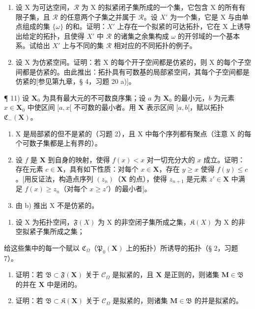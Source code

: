 \begin{enumerate}
\def\labelenumi{\arabic{enumi})}
\setcounter{enumi}{8}
\item
  设 X 为可达空间，\(\mathcal{R}\) 为 X 的拟紧闭子集所成的一个集，它包含 X 的所有有限子集，且 \(\mathcal{R}\) 的任意两个子集之并属于 \(\mathcal{R}\)。设 \(X'\) 为一个集，它是 X 与由单点组成的集 \(\{\omega\}\) 的和。证明：\(X'\) 上存在一个拟紧的可达拓扑，它在 X 上诱导出给定的拓扑，且使得 \(X'\) 中 \(\mathcal{R}\) 的诸集之余集构成 \(\omega\) 的开邻域的一个基本系。试给出 \(X'\) 上与不同的集 \(\mathcal{R}\) 相对应的不同拓扑的例子。
\item
  设 X 为仿紧空间。证明：若 X 的每个开子空间都是仿紧的，则 X 的每个子空间都是仿紧的。由此推出：拓扑具有可数基的局部紧空间，其每个子空间都是仿紧的{[}参见第九章，§ 4，习题 20 a){]}。
\end{enumerate}

¶ 11) 设 \(\mathbf{X}_0\) 为具有最大元的不可数良序集；设 \(a\) 为 \(\mathbf{X}_0\) 的最小元，\(b\) 为元素 \(x \in \mathbf{X}_0\) 中使区间 \([a, x[\) 不可数的最小者。用 \(\mathbf{X}\) 表示区间 \([a, b[\)，赋以拓扑 \(\mathfrak{C}_{-}(\mathbf{X})\)。

\begin{enumerate}
\def\labelenumi{\alph{enumi})}
\item
  X 是局部紧的但不是紧的（习题 2），且 X 中每个序列都有聚点（注意 X 的每个可数子集都是上有界的）。
\item
  设 \(f\) 是 \(\mathbf{X}\) 到自身的映射，使得 \(f(x) < x\) 对一切充分大的 \(x\) 成立。证明：存在元素 \(c \in \mathbf{X}\)，具有如下性质：对每个 \(x \in \mathbf{X}\)，存在 \(y \geqslant x\) 使得 \(f(y) \leqslant c\)。{[}用反证法，构造点序列 \((z_n)\)（\(\mathbf{X}\) 的点），使得 \(z_{n+1}\) 是元素 \(z' \in \mathbf{X}\) 中满足 \(f(x) \geqslant z_n\)（对每个 \(x \geqslant z'\)）的最小者{]}。
\item
  由 b) 推出 X 不是仿紧的。
\end{enumerate}

\begin{enumerate}
\def\labelenumi{\arabic{enumi})}
\setcounter{enumi}{11}
\tightlist
\item
  设 X 为拓扑空间，\(\mathfrak{F}(X)\) 为 X 的非空闭子集所成之集，\(\mathfrak{K}(X)\) 为 X 的非空拟紧子集所成之集；
\end{enumerate}

给这些集中的每一个赋以 \(\mathfrak{C}_{\Omega}\)（\(\mathfrak{P}_{0}(\mathbf{X})\) 上的拓扑）所诱导的拓扑（§ 2，习题 7）。

\begin{enumerate}
\def\labelenumi{\alph{enumi})}
\tightlist
\item
  证明：若 \(\mathfrak{B} \subset \mathfrak{F}(\mathbf{X})\) 关于 \(\mathcal{C}_{\Omega}\) 是拟紧的，且 \(\mathbf{X}\) 是正则的，则诸集 \(\mathbf{M} \in \mathfrak{B}\) 的并在 \(\mathbf{X}\) 中是闭的。\\
\item
  证明：若 \(\mathfrak{B} \subset \mathfrak{K}(\mathbf{X})\) 关于 \(\mathcal{C}_{\Omega}\) 是拟紧的，则诸集 \(\mathbf{M} \in \mathfrak{B}\) 的并是拟紧的。
\end{enumerate}

